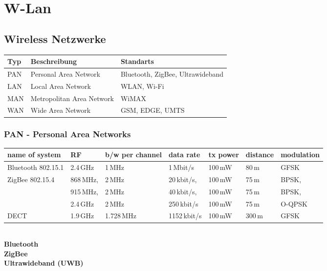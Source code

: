 \section{W-Lan}
\subsection{Wireless Netzwerke}
\begin{tabular}{|l|l|l|}
	\hline
	\textbf{Typ} & \textbf{Beschreibung} & \textbf{Standarts}\\
	\hline
	PAN & Personal Area Network & Bluetooth, ZigBee, Ultrawideband\\
	\hline
	LAN & Local Area Network & WLAN, Wi-Fi\\
	\hline
	MAN & Metropolitan Area Network & WiMAX\\
	\hline
	WAN & Wide Area Network & GSM, EDGE, UMTS\\
	\hline
\end{tabular}
\subsubsection{PAN - Personal Area Networks }
\begin{tabular}{|l|l|l|l|l|l|l|} \hline
name of system & RF & b/w per channel & data rate  & tx power	& distance  & modulation  \\
\hline \hline
Bluetooth 802.15.1 & 2.4\,GHz	& 1\,MHz	& 1\,Mbit/s	      & 100\,mW	 & 80\,m	& GFSK \\ \hline
ZigBee 802.15.4	   & 868\,MHz,& 2\,MHz	& 20\,kbit/s,     & 100\,mW  & 75\,m	& BPSK, \\
              	   & 915\,MHz,& 2\,MHz	& 40\,kbit/s,     & 100\,mW  & 75\,m	& BPSK,  \\
                   & 2.4\,GHz & 2\,MHz	& 250\,kbit/s     & 100\,mW  & 75\,m	& O-QPSK \\ \hline
DECT	             & 1.9\,GHz	& 1.728\,MHz & 1152\,kbit/s	& 100\,mW	 & 300\,m	& GFSK \\ \hline
\end{tabular}\\

\textbf{Bluetooth }\\
\textbf{ZigBee }\\
\textbf{Ultrawideband (UWB)}

